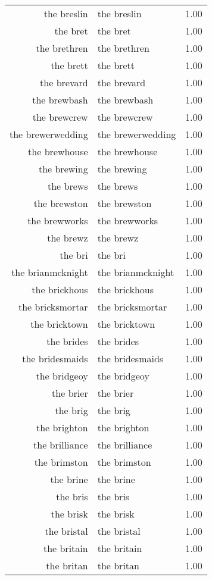 \begin{table}[ht]
\begin{tabular}{rlr}
  the breslin & the breslin & 1.00 \\ 
  the bret & the bret & 1.00 \\ 
  the brethren & the brethren & 1.00 \\ 
  the brett & the brett & 1.00 \\ 
  the brevard & the brevard & 1.00 \\ 
  the brewbash & the brewbash & 1.00 \\ 
  the brewcrew & the brewcrew & 1.00 \\ 
  the brewerwedding & the brewerwedding & 1.00 \\ 
  the brewhouse & the brewhouse & 1.00 \\ 
  the brewing & the brewing & 1.00 \\ 
  the brews & the brews & 1.00 \\ 
  the brewston & the brewston & 1.00 \\ 
  the brewworks & the brewworks & 1.00 \\ 
  the brewz & the brewz & 1.00 \\ 
  the bri & the bri & 1.00 \\ 
  the brianmcknight & the brianmcknight & 1.00 \\ 
  the brickhous & the brickhous & 1.00 \\ 
  the bricksmortar & the bricksmortar & 1.00 \\ 
  the bricktown & the bricktown & 1.00 \\ 
  the brides & the brides & 1.00 \\ 
  the bridesmaids & the bridesmaids & 1.00 \\ 
  the bridgeoy & the bridgeoy & 1.00 \\ 
  the brier & the brier & 1.00 \\ 
  the brig & the brig & 1.00 \\ 
  the brighton & the brighton & 1.00 \\ 
  the brilliance & the brilliance & 1.00 \\ 
  the brimston & the brimston & 1.00 \\ 
  the brine & the brine & 1.00 \\ 
  the bris & the bris & 1.00 \\ 
  the brisk & the brisk & 1.00 \\ 
  the bristal & the bristal & 1.00 \\ 
  the britain & the britain & 1.00 \\ 
  the britan & the britan & 1.00 \\ 

\end{tabular}
\end{table}
